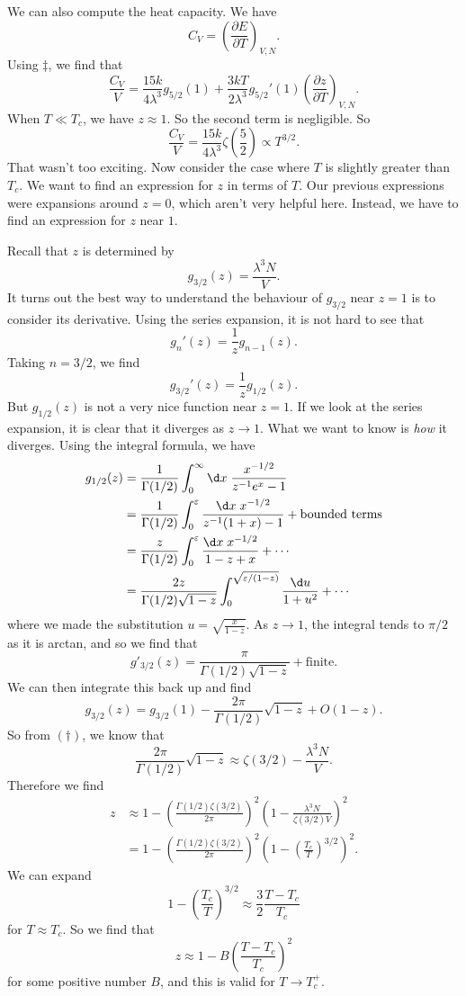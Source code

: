\documentclass[a4paper]{article}
\begin{document}
We can also compute the heat capacity. We have
\[
  C_V = \left(\frac{\partial E}{\partial T}\right)_{V, N}.
\]
Using $\ddagger$, we find that
\[
  \frac{C_V}{V} = \frac{15k}{4 \lambda^3} g_{5/2}(1) + \frac{3kT}{2\lambda^3} g_{5/2}'(1) \left(\frac{\partial z}{\partial T}\right)_{V, N}.
\]
When $T \ll T_c$, we have $z \approx 1$. So the second term is negligible. So
\[
  \frac{C_V}{V} = \frac{15k}{4\lambda^3} \zeta\left(\frac{5}{2}\right) \propto T^{3/2}.
\]
That wasn't too exciting. Now consider the case where $T$ is slightly greater than $T_c$. We want to find an expression for $z$ in terms of $T$. Our previous expressions were expansions around $z = 0$, which aren't very helpful here. Instead, we have to find an expression for $z$ near $1$.

Recall that $z$ is determined by
\[
  g_{3/2}(z) = \frac{\lambda^3 N}{V}.
\]
It turns out the best way to understand the behaviour of $g_{3/2}$ near $z = 1$ is to consider its derivative. Using the series expansion, it is not hard to see that
\[
  g_n'(z) = \frac{1}{z} g_{n - 1}(z).
\]
Taking $n = 3/2$, we find
\[
  g_{3/2}'(z) = \frac{1}{z} g_{1/2}(z).
\]
But $g_{1/2}(z)$ is not a very nice function near $z = 1$. If we look at the series expansion, it is clear that it diverges as $z \to 1$. What we want to know is \emph{how} it diverges. Using the integral formula, we have
\begin{align*}
  g_{1/2}(z) &= \frac{1}{\Gamma(1/2)} \int_0^\infty \d x\; \frac{x^{-1/2}}{z^{-1}e^x - 1} \\
  &= \frac{1}{\Gamma(1/2)} \int_0^\varepsilon \frac{\d x\; x^{-1/2}}{z^{-1}(1 + x) - 1} + \text{bounded terms}\\
  &= \frac{z}{\Gamma(1/2)} \int_0^\varepsilon \frac{\d x\; x^{-1/2}}{1 - z + x} + \cdots\\
  &= \frac{2z}{\Gamma(1/2)\sqrt{1 - z}} \int_0^{\sqrt{\varepsilon/(1 - z)}} \frac{\d u}{1 + u^2} + \cdots
\end{align*}
where we made the substitution $u = \sqrt{\frac{x}{1 - z}}$. As $z \to 1$, the integral tends to $\pi/2$ as it is arctan, and so we find that
\[
  g'_{3/2}(z) = \frac{\pi}{\Gamma(1/2)\sqrt{1 - z}} + \text{finite}.
\]
We can then integrate this back up and find
\[
  g_{3/2}(z) = g_{3/2}(1) - \frac{2\pi}{\Gamma(1/2)} \sqrt{1 - z} + O(1 - z).
\]
So from $(\dagger)$, we know that
\[
  \frac{2\pi}{\Gamma(1/2)} \sqrt{1 - z} \approx \zeta(3/2) - \frac{\lambda^3 N}{V}.
\]
Therefore we find
\begin{align*}
  z &\approx 1 - \left(\frac{\Gamma(1/2) \zeta(3/2)}{2\pi}\right)^2 \left(1 - \frac{\lambda^3 N}{\zeta(3/2) V}\right)^2 \\
  &= 1 - \left(\frac{\Gamma(1/2) \zeta(3/2)}{2\pi}\right)^2 \left(1 - \left(\frac{T_c}{T}\right)^{3/2}\right)^2.
\end{align*}
We can expand
\[
  1 - \left(\frac{T_c}{T}\right)^{3/2} \approx \frac{3}{2} \frac{T - T_c}{T_c}
\]
for $T \approx T_c$. So we find that
\[
  z \approx 1 - B \left(\frac{T - T_c}{T_c}\right)^2
\]
for some positive number $B$, and this is valid for $T \to T_c^+$.
\end{document}
